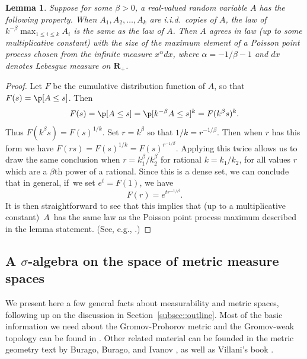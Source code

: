 \documentclass[JEP,XML,SOM,Unicode]{cedram}
\theoremstyle{plain}
\numberwithin{theorem}{section}
\newtheorem{lemma}[theorem]{Lemma}
\theoremstyle{definition}
\newcommand{\R}{\mathbf{R}}
\begin{document}
\begin{lemma}
\label{lem::stabilityundersuprema}
Suppose for some $\beta>0$, a real-valued random variable $A$ has the following property. When $A_1, A_2, \ldots, A_k$ are i.i.d.\ copies of $A$, the law of $k^{-\beta} \max_{1 \leq i \leq k} A_i$ is the same as the law of $A$. Then $A$ agrees in law (up to some multiplicative constant) with the size of the maximum element of a Poisson point process chosen from the infinite measure $x^{\alpha} dx$, where $\alpha= -1/\beta-1$ and $dx$ denotes Lebesgue measure on $\R_+$.
\end{lemma}
\begin{proof}
Let $F$ be the cumulative distribution function of $A$, so that $F(s) = \p[A \leq s]$. Then\vspace*{-3pt}
\[
F(s) = \p[ A \leq s] = \p[k^{-\beta} A \leq s]^k = F(k^\beta s)^k.
\]
Thus $F(k^\beta s) = F(s)^{1/k}$. Set $r =k^\beta$ so that $1/k = r^{-1/\beta}$. Then when $r$ has this form we have $F(r s) = F(s)^{1/k} = F(s)^{r^{-1/\beta}}$. Applying this twice allows us to draw the same conclusion when $r = k_1^\beta/ k_2^\beta$ for rational $k = k_1/k_2$, \ie for all values $r$ which are a $\beta$th power of a rational. Since this is a dense set, we can conclude that in general, if~we set $e^t = F(1)$, we have\vspace*{-3pt}
\begin{equation}
\label{eqn::a_dist_function}
F(r) = e^{t r^{-1/\beta}}.
\end{equation}
It is then straightforward to see that this implies that (up to a multiplicative constant)~$A$~has the same law as the Poisson point process maximum described in the lemma statement. (See, e.g., \cite[Exer.\,22.4]{satolevyprocesses}.)
\end{proof}

\subsection{A \texorpdfstring{$\sigma$}{s}-algebra on the space of metric measure spaces}
\label{subsec::mmsigma}

We present here a few general facts about measurability and metric spaces, following up on the discussion in Section~\ref{subsec::outline}. Most of the basic information we need about the Gromov-Prohorov metric and the Gromov-weak topology can be found in \cite{grevenpfaffelhuberwinter}. Other related material can be founded in the metric geometry text by Burago, Burago, and Ivanov \cite{courseinmetricgeometry}, as well as Villani's book \cite[Chaps.\,27-28]{villanibook}.
\end{document}

